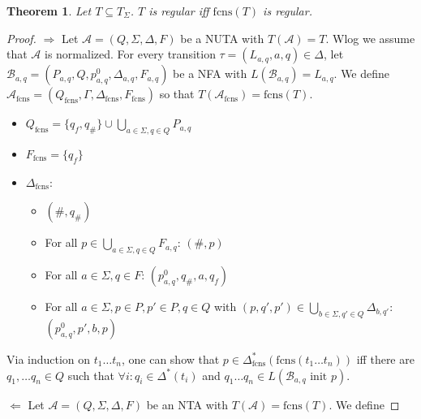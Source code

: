 \documentclass{article}
\newtheorem{theorem}{Theorem}
\begin{document}
\vspace{1cm}
\begin{theorem}
\label{fcns_correct}
	Let $T \subseteq T_\Sigma$. $T$ is regular iff $\text{fcns}(T)$ is regular.
\end{theorem}
\begin{proof}
	$\boldsymbol{\Rightarrow}$ Let $\mathcal{A} = (Q, \Sigma, \Delta, F)$ be a NUTA with $T(\mathcal{A}) = T$. Wlog we assume that $\mathcal{A}$ is normalized. For every transition $\tau = (L_{a,q}, a, q) \in \Delta$, let $\mathcal{B}_{a,q} = (P_{a,q}, Q, p^0_{a,q}, \Delta_{a,q}, F_{a,q})$ be a NFA with $L(\mathcal{B}_{a,q}) = L_{a,q}$. We define $\mathcal{A}_\text{fcns} = (Q_\text{fcns}, \Gamma, \Delta_\text{fcns}, F_\text{fcns})$ so that $T(\mathcal{A}_\text{fcns}) = \text{fcns}(T)$.
	
	\begin{itemize}
		\item $Q_\text{fcns} = \{q_f, q_\#\} \cup \bigcup\limits_{a \in \Sigma, q \in Q} P_{a, q}$
		\item $F_\text{fcns} = \{q_f\}$
		\item $\Delta_\text{fcns}$:
		\begin{itemize}
			\item $(\#, q_\#)$
			\item For all $p \in \bigcup\limits_{a \in \Sigma, q \in Q} F_{a, q}$: $(\#, p)$
			\item For all $a \in \Sigma, q \in F$: $(p^0_{a,q}, q_\#, a, q_f)$
			\item For all $a \in \Sigma, p \in P, p' \in P, q \in Q$ with $(p, q', p') \in \bigcup\limits_{b \in \Sigma, q' \in Q} \Delta_{b, q'}$: $(p^0_{a,q}, p', b, p)$
		\end{itemize}
	\end{itemize}
	
	Via induction on $t_1 \dots t_n$, one can show that $p \in \Delta^*_\text{fcns}(\text{fcns}(t_1 \dots t_n))$ iff there are $q_1, \dots q_n \in Q$ such that $\forall i: q_i \in \Delta^*(t_i)$ and $q_1 \dots q_n \in L(\mathcal{B}_{a,q} \text{ init } p)$.
	
	$\boldsymbol{\Leftarrow}$ Let $\mathcal{A} = (Q, \Sigma, \Delta, F)$ be an NTA with $T(\mathcal{A}) = \text{fcns}(T)$. We define %
\end{proof}
\end{document}
